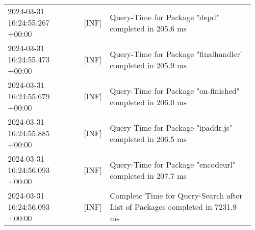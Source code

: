 \documentclass[10pt,a4paper,twoside]{article}
\begin{document}
\begin{appendices}
{{\begin{tabularx}{\textwidth}{|l|l|X|}
                    2024-03-31 16:24:55.267 +00:00 & [INF] & Query-Time for Package "depd" completed in 205.6 ms \\
                    2024-03-31 16:24:55.473 +00:00 & [INF] & Query-Time for Package "finalhandler" completed in 205.9 ms \\
                    2024-03-31 16:24:55.679 +00:00 & [INF] & Query-Time for Package "on-finished" completed in 206.0 ms \\
                    2024-03-31 16:24:55.885 +00:00 & [INF] & Query-Time for Package "ipaddr.js" completed in 206.5 ms \\
                    2024-03-31 16:24:56.093 +00:00 & [INF] & Query-Time for Package "encodeurl" completed in 207.7 ms \\
                    2024-03-31 16:24:56.093 +00:00 & [INF] & Complete Time for Query-Search after List of Packages completed in 7231.9 ms \\
                    \hline
                \end{tabularx}
                }
                }
    \end{appendices}

    \newpage
    \printbibheading[title={Quellen}]
    \printbibliography[type=book, heading=subbibliography, title={Literatur}]

    \newpage
    \listoffigures
    \newpage
    \listoftables
\end{document}
